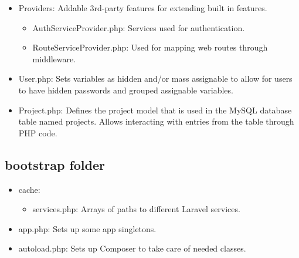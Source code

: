 \documentclass[11pt]{report}
\begin{document}
\begin{itemize}
    \item Providers: Addable 3rd-party features for extending built in features.
    \begin{itemize}
        \item AuthServiceProvider.php: Services used for authentication.
        \item RouteServiceProvider.php: Used for mapping web routes through middleware.
    \end{itemize}
    \item User.php: Sets variables as hidden and/or mass assignable to allow for users to have hidden passwords and grouped assignable variables.
    \item Project.php: Defines the project model that is used in the MySQL database table named projects. Allows interacting with entries from the table through PHP code.
\end{itemize}


\subsection{bootstrap folder}
\begin{itemize}
    \item cache: 
    \begin{itemize}
        \item services.php: Arrays of paths to different Laravel services.
    \end{itemize}
    \item app.php: Sets up some app singletons.
    \item autoload.php: Sets up Composer to take care of needed classes.
\end{itemize}

\end{document}
